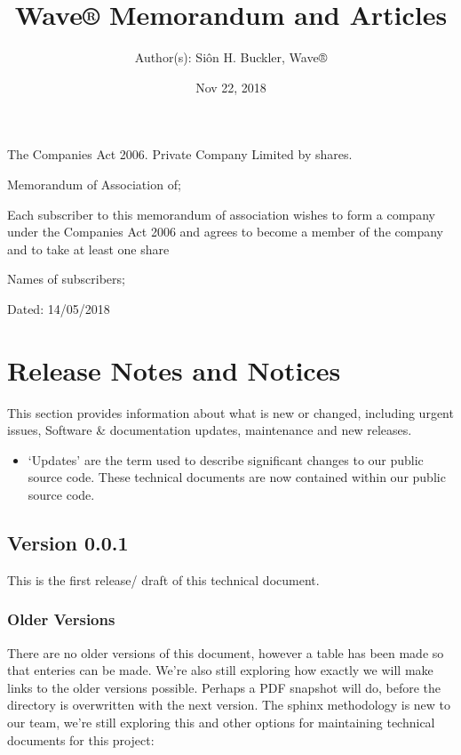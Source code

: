 \documentclass[letterpaper,10pt,english]{sphinxmanual}
\title{Wave® Memorandum and Articles}
\date{Nov 22, 2018}
\author{Author(s): Siôn H. Buckler, Wave®}
\begin{document}
\pagestyle{empty}
\maketitle
\pagestyle{plain}
\sphinxtableofcontents
\pagestyle{normal}
\label{\detokenize{index::doc}}


The Companies Act 2006. Private Company Limited by shares.

Memorandum of Association of; 

Each subscriber to this memorandum of association wishes to form a company under the Companies Act 2006 and agrees to become a member of the company and to take at least one share

Names of subscribers; 

Dated: 14/05/2018


\chapter{Release Notes and Notices}
\label{\detokenize{releasenotes:release-notes-and-notices}}\label{\detokenize{releasenotes::doc}}
This section provides information about what is new or changed, including urgent issues, Software \& documentation updates, maintenance and new releases.
\begin{itemize}
\item {} 
‘Updates’ are the term used to describe significant changes to our public source code. These technical documents are now contained within our public source code.

\end{itemize}


\section{Version 0.0.1}
\label{\detokenize{releasenotes:version-0-0-1}}
This is the first release/ draft of this technical document.


\subsection{Older Versions}
\label{\detokenize{releasenotes:older-versions}}
There are no older versions of this document, however a table has been made so that enteries can be made. We’re also still exploring how exactly we will make links to the older versions possible. Perhaps a PDF snapshot will do, before the directory is overwritten with the next version. The sphinx methodology is new to our team, we’re still exploring this and other options for maintaining technical documents for this project:
\end{document}
